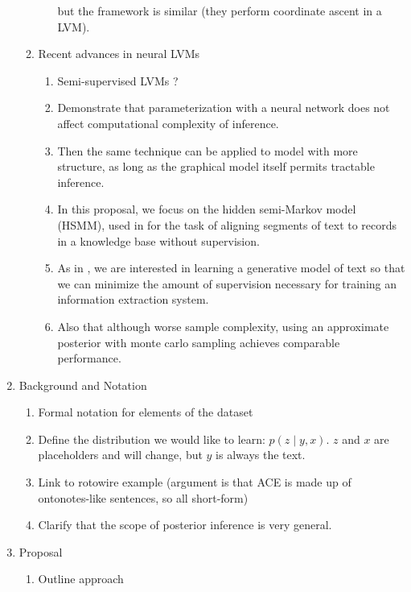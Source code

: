 \documentclass[12pt]{article}
\begin{document}
\begin{enumerate}
\begin{enumerate}
\begin{enumerate}
            but the framework is similar (they perform coordinate ascent in a LVM).
        \end{enumerate}
    \item Recent advances in neural LVMs
        \begin{enumerate}
        \item Semi-supervised LVMs \citet{kingma2014ssvae}?
        \item Demonstrate that parameterization with a neural network does not affect computational
            complexity of inference.
        \item Then the same technique can be applied to model with more structure,
            as long as the graphical model itself permits tractable inference.
        \item In this proposal, we focus on the hidden semi-Markov model (HSMM),
            used in \citet{liang2009semalign} for the task of aligning segments of text to
            records in a knowledge base without supervision. 
        \item As in \citet{liang2009semalign}, we are interested in learning a generative model of text so that
            we can minimize the amount of supervision necessary for training an
            information extraction system.
        \item Also that although worse sample complexity, using an approximate posterior
            with monte carlo sampling achieves comparable performance.
        \end{enumerate}
    \end{enumerate}
\item Background and Notation
    \begin{enumerate}
    \item Formal notation for elements of the dataset
    \item Define the distribution we would like to learn: $p(z\mid y, x)$.
        $z$ and $x$ are placeholders and will change, but $y$ is always the text.
    \item Link to rotowire example
        (argument is that ACE is made up of ontonotes-like sentences, so all short-form)
    \item Clarify that the scope of posterior inference is very general.
    \end{enumerate}
\item Proposal
    \begin{enumerate}
    \item Outline approach
        \begin{enumerate}

\end{enumerate}
\end{enumerate}
\end{enumerate}
\end{document}
